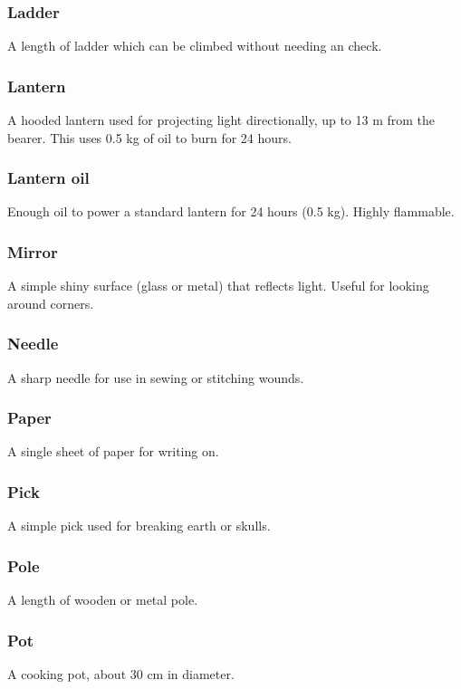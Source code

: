 \documentclass[a4paper,11pt,oneside]{book}
\newcommand{\textlf}[1]{\textbf{\titlecap{#1}}}
\begin{document}
\subsubsection{Ladder}
A length of ladder which can be climbed without needing an \textlf{Athletics} check.

\subsubsection{Lantern}
A hooded lantern used for projecting \textlf{full} light directionally, up to 13 m from the bearer. This uses 0.5 kg of oil to burn for 24 hours.

\subsubsection{Lantern oil}
Enough oil to power a standard lantern for 24 hours (0.5 kg). Highly flammable.

\subsubsection{Mirror}
A simple shiny surface (glass or metal) that reflects light. Useful for looking around corners.

\subsubsection{Needle}
A sharp needle for use in sewing or stitching wounds.

\subsubsection{Paper}
A single sheet of paper for writing on.

\subsubsection{Pick}
A simple pick used for breaking earth or skulls.

\subsubsection{Pole}
A length of wooden or metal pole.

\subsubsection{Pot}
A cooking pot, about 30 cm in diameter.
\end{document}

